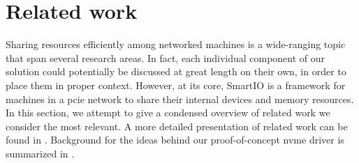 \section{Related work}\label{sec:rw}
Sharing resources efficiently among networked machines is a wide-ranging topic that span several research areas.
%
In fact, each individual component of our solution could potentially be discussed at great length on their own, in order to place them in proper context.
%
However, at its core, SmartIO is a framework for machines in a \gls{pcie} network to share their internal devices and memory resources.
%
In this section, we attempt to give a condensed overview of related work we consider the most relevant.
%
A more detailed presentation of related work can be found in .
%
Background for the ideas behind our proof-of-concept \gls{nvme} driver is summarized in .


